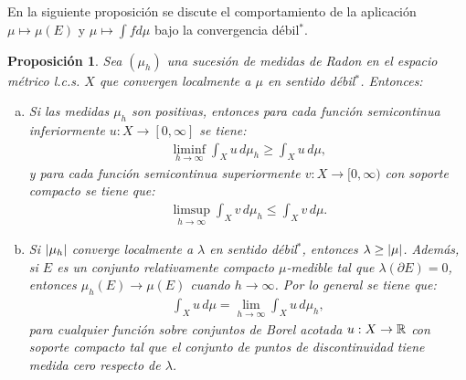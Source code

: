 \documentclass[a4paper,11pt,spanish, twoside, leqno]{tfm-uam}
\newtheorem{prop}[teo]{Proposición}
\begin{document}
En la siguiente proposición se discute el comportamiento de la aplicación $\mu\mapsto \mu(E)$ y $\mu\mapsto \int f d\mu$ bajo la convergencia débil$^{*}$.
\begin{prop}\label{prop:convergencia dominada de medidas}
Sea $(\mu_{h})$ una sucesión de medidas de Radon en el espacio métrico  l.c.s. $X$ que convergen localmente a $\mu$ en sentido débil$^{*}$. Entonces:
\begin{enumerate}[(a)]
\item Si las medidas $\mu_{h}$ son positivas, entonces para cada función semicontinua inferiormente $u:X\to [0,\infty]$ se tiene:
\begin{align*}
\liminf_{h\to \infty} \int_{X}u \, d\mu_{h}\geq \int_{X}u\,d\mu,
\end{align*} 
y para cada función semicontinua superiormente $v: X\to [0, \infty)$ con soporte compacto se tiene que:
\begin{align*}
\limsup_{h\to \infty}\int_{X}v\,d\mu_{h}\leq \int_{X}v\,d\mu.
\end{align*}\label{prop:convergencia dominada de medidas:a}
\item Si $\lvert\mu_{h}\rvert$ converge localmente a $\lambda$ en sentido débil$^{*}$, entonces $\lambda\geq \lvert\mu\rvert$. Además, si $E$ es un conjunto relativamente compacto $\mu$-medible tal que $\lambda(\partial E)=0$, entonces $\mu_{h}(E)\to \mu(E)$ cuando $h\to \infty$. Por lo general se tiene que:
\begin{align*}
\int_{X}u \,d\mu = \lim_{h\to \infty}\int_{X}u\, d\mu_{h},
\end{align*}
para cualquier función sobre conjuntos de Borel acotada $u:X\to \mathbb{R}$ con soporte compacto tal que el conjunto de puntos de discontinuidad tiene medida cero respecto de $\lambda$.\label{prop:convergencia dominada de medidas:b}
\end{enumerate}
\end{prop}
\end{document}
